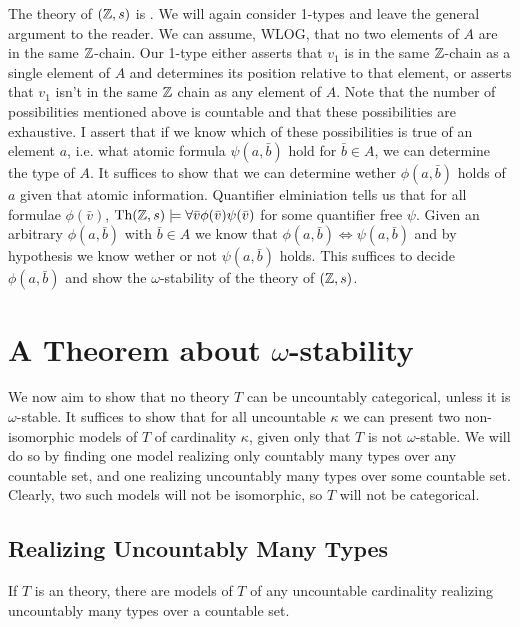 \begin{example}\label{example_omst_Z}
The theory of \((\mathbb{Z}, s)\) is \omst. 
We will again consider 1-types and leave the general argument to the reader. 
We can assume, WLOG, that no two elements of \(A\) are in the same \(\mathbb{Z}\)-chain. 
Our 1-type either asserts that \(v_1\) is in the same \(\mathbb{Z}\)-chain as a single element of \(A\) and determines its position relative to that element, or asserts that \(v_1\) isn't in the same \(\mathbb{Z}\) chain as any element of \(A\). 
Note that the number of possibilities mentioned above is countable and that these possibilities are exhaustive.
I assert that if we know which of these possibilities is true of an element \(a\), i.e. what atomic formula \(\psi(a, \bar{b})\) hold for \(\bar{b} \in A\), we can determine the type of \(A\). 
It suffices to show that we can determine wether \(\phi(a, \bar{b})\) holds of \(a\) given that atomic information.  
Quantifier elminiation tells us that for all formulae \(\phi(\bar{v})\), \(\text{Th}(\mathbb{Z}, s) \models \forall \bar{v} \phi(\bar{v}) \psi(\bar{v})\) for some quantifier free \(\psi\).
Given an arbitrary \(\phi(a, \bar{b})\) with \(\bar{b} \in A\) we know that \(\phi(a, \bar{b}) \iff  \psi(a, \bar{b})\) and by hypothesis we know wether or not \(\psi(a, \bar{b})\) holds. 
This suffices to decide \(\phi(a, \bar{b})\) and show the \(\omega\)-stability of the theory of \((\mathbb{Z}, s)\).
\end{example}

\section{A Theorem about \(\omega\)-stability}
We now aim to show that no theory \(T\) can be uncountably categorical, unless it is \(\omega\)-stable.
It suffices to show that for all uncountable \(\kappa\) we can present two non-isomorphic models of \(T\) of cardinality \(\kappa\), given only that \(T\) is not \(\omega\)-stable.  
We will do so by finding one model realizing only countably many types over any countable set, and one realizing uncountably many types over some countable set. 
Clearly, two such models will not be isomorphic, so \(T\) will not be categorical. 

\subsection{Realizing Uncountably Many Types}
\begin{theorem}\label{theorem_realizing_uncountable_types}
If \(T\) is an \omst theory, there are models of \(T\) of any uncountable cardinality realizing uncountably many types over a countable set.
\end{theorem}

